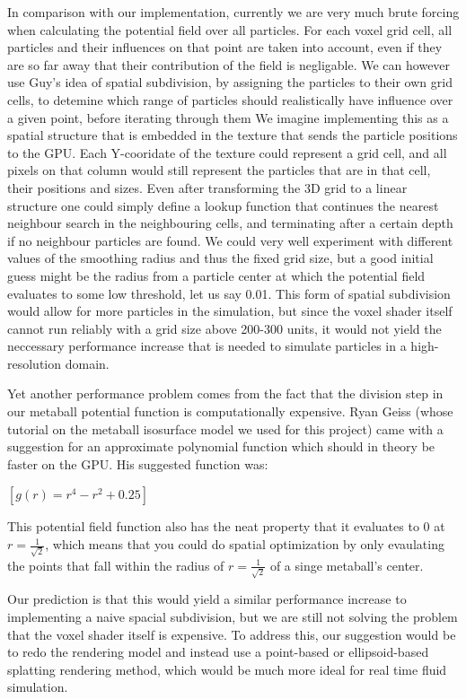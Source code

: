 \documentclass{article}
\begin{document}
\begin{multicols}{2}
        In comparison with our implementation, currently we are very much brute forcing when calculating the potential field over all particles.
        For each voxel grid cell, all particles and their influences on that point are taken into account, even if they are so far away that their contribution of the field is negligable.
        We can however use Guy's idea of spatial subdivision, by assigning the particles to their own grid cells, to detemine which range of particles should realistically have influence over a given point, before iterating through them 
        We imagine implementing this as a spatial structure that is embedded in the texture that sends the particle positions to the GPU.
        Each Y-cooridate of the texture could represent a grid cell, and all pixels on that column would still represent the particles that are in that cell, their positions and sizes.
        Even after transforming the 3D grid to a linear structure one could simply define a lookup function that continues the nearest neighbour search in the neighbouring cells, and terminating after a certain depth if no neighbour particles are found.
        We could very well experiment with different values of the smoothing radius and thus the fixed grid size, but a good initial guess might be the radius from a particle center at which the potential field evaluates to some low threshold, let us say 0.01. 
        This form of spatial subdivision would allow for more particles in the simulation, but since the voxel shader itself cannot run reliably with a grid size above 200-300 units, it would not yield the neccessary performance increase that is needed to simulate particles in a high-resolution domain.

        Yet another performance problem comes from the fact that the division step in our metaball potential function is computationally expensive.
        Ryan Geiss (whose tutorial on the metaball isosurface model we used for this project) came with a suggestion for an approximate polynomial function which should in theory be faster on the GPU. His suggested function was:

        \begin{center}
        $[g(r) = r^4 - r^2 + 0.25]$
        \end{center}

        This potential field function also has the neat property that it evaluates to 0 at $r=\frac{1}{\sqrt{2}}$, which means that you could do spatial optimization by only evaulating the points that fall within the radius of $r=\frac{1}{\sqrt{2}}$ of a singe metaball's center.
        \cite{geiss00}

        Our prediction is that this would yield a similar performance increase to implementing a naive spacial subdivision, but we are still not solving the problem that the voxel shader itself is expensive.
        To address this, our suggestion would be to redo the rendering model and instead use a point-based or ellipsoid-based splatting rendering method, which would be much more ideal for real time fluid simulation.

	\end{multicols}
\end{document}
